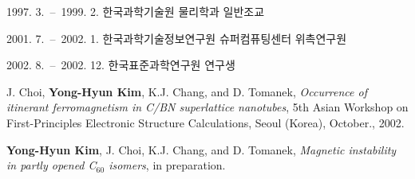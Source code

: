\documentclass[doctor,english,final]{kaist-ucs}
\begin{document}
    \begin{career}
        \item[1997. 3.\ --\ 1999. 2.] 한국과학기술원 물리학과 일반조교
        \item[2001. 7.\ --\ 2002. 1.] 한국과학기술정보연구원 슈퍼컴퓨팅센터 위촉연구원
        \item[2002. 8.\ --\ 2002. 12.] 한국표준과학연구원 연구생
    \end{career}

    \begin{activity}
        \item J. Choi, \textbf{Yong-Hyun Kim}, K.J. Chang, and D. Tomanek,
             \textit{Occurrence of itinerant ferromagnetism in C/BN superlattice
             nanotubes}, 5th Asian Workshop on First-Principles Electronic
             Structure Calculations, Seoul (Korea), October., 2002.
    \end{activity}

    \begin{publication}
        \item \textbf{Yong-Hyun Kim}, J. Choi, K.J. Chang, and D. Tomanek,
             \textit{Magnetic instability in partly opened C$_{60}$ isomers},
             in preparation.
    \end{publication}

\end{document}
